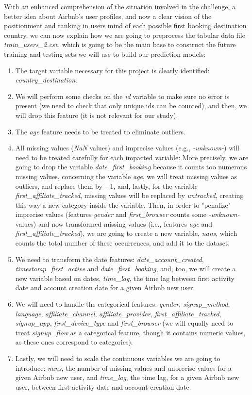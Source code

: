 \documentclass[twocolumn, switch]{article}
\begin{document}
With an enhanced comprehension of the situation involved in the challenge, a better idea about Airbnb's user profiles, and now a clear vision of the positionment and ranking in users mind of each possible first booking destination country, we can now explain how we are going to preprocess the tabular data file \textit{train\_users\_2.csv}, which is going to be the main base to construct the future training and testing sets we will use to build our prediction models:
\begin{enumerate}
\item The target variable necessary for this project is clearly identified: \textit{country\_destination}.
\item We will perform some checks on the \textit{id} variable to make sure no error is present (we need to check that only unique ids can be counted), and then, we will drop this feature (it is not relevant for our study).
\item The \textit{age} feature needs to be treated to eliminate outliers.
\item All missing values (\textit{NaN} values) and imprecise values (e.g., \textit{-unknown-}) will need to be treated carefully for each impacted variable: More precisely, we are going to drop the variable \textit{date\_first\_booking} because it counts too numerous missing values, concerning the variable \textit{age}, we will treat missing values as outliers, and replace them by $-1$, and, lastly, for the variable \textit{first\_affiliate\_tracked}, missing values will be replaced by \textit{untracked}, creating this way a new category inside the variable. Then, in order to "penalize" imprecise values (features \textit{gender} and \textit{first\_browser} counts some \textit{-unknown-} values) and now transformed missing values (i.e., features \textit{age} and \textit{first\_affiliate\_tracked}), we are going to create a new variable, \textit{nans}, which counts the total number of these occurrences, and add it to the dataset.
\item We need to transform the date features: \textit{date\_account\_created}, \textit{timestamp\_first\_active} and \textit{date\_first\_booking}, and, too, we will create a new variable based on dates, \textit{time\_lag}, the time lag between first activity date and account creation date for a given Airbnb new user.
\item We will need to handle the categorical features: \textit{gender}, \textit{signup\_method}, \textit{language}, \textit{affiliate\_channel}, \textit{affiliate\_provider}, \textit{first\_affiliate\_tracked}, \textit{signup\_app}, \textit{first\_device\_type} and \textit{first\_browser} (we will equally need to treat \textit{signup\_flow} as a categorical feature, though it contains numeric values, as these ones correspond to categories).
\item Lastly, we will need to scale the continuous variables we are going to introduce: \textit{nans}, the number of missing values and unprecise values for a given Airbnb new user, and \textit{time\_lag}, the time lag, for a given Airbnb new user, between first activity date and account creation date.
\end{enumerate}
\end{document}
